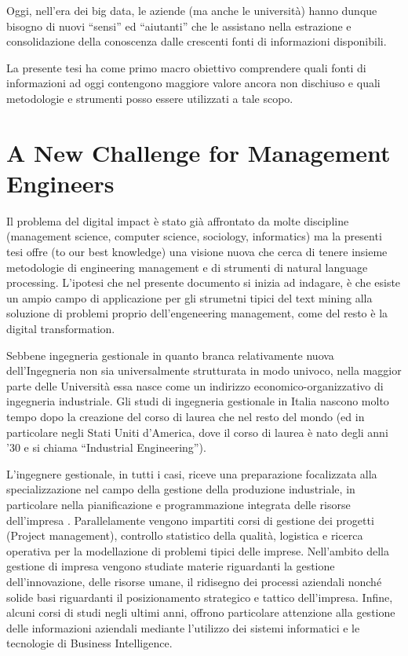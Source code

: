 \documentclass[]{book}
\begin{document}
Oggi, nell'era dei big data, le aziende (ma anche le università) hanno
dunque bisogno di nuovi ``sensi'' ed ``aiutanti'' che le assistano nella
estrazione e consolidazione della conoscenza dalle crescenti fonti di
informazioni disponibili.

La presente tesi ha come primo macro obiettivo comprendere quali fonti
di informazioni ad oggi contengono maggiore valore ancora non dischiuso
e quali metodologie e strumenti posso essere utilizzati a tale scopo.

\section{A New Challenge for Management
Engineers}\label{a-new-challenge-for-management-engineers}

Il problema del digital impact è stato già affrontato da molte
discipline (management science, computer science, sociology,
informatics) ma la presenti tesi offre (to our best knowledge) una
visione nuova che cerca di tenere insieme metodologie di engineering
management e di strumenti di natural language processing. L'ipotesi che
nel presente documento si inizia ad indagare, è che esiste un ampio
campo di applicazione per gli strumetni tipici del text mining alla
soluzione di problemi proprio dell'engeneering management, come del
resto è la digital transformation.

Sebbene ingegneria gestionale in quanto branca relativamente nuova
dell'Ingegneria non sia universalmente strutturata in modo univoco,
nella maggior parte delle Università essa nasce come un indirizzo
economico-organizzativo di ingegneria industriale. Gli studi di
ingegneria gestionale in Italia nascono molto tempo dopo la creazione
del corso di laurea che nel resto del mondo (ed in particolare negli
Stati Uniti d'America, dove il corso di laurea è nato degli anni '30 e
si chiama ``Industrial Engineering'').

L'ingegnere gestionale, in tutti i casi, riceve una preparazione
focalizzata alla specializzazione nel campo della gestione della
produzione industriale, in particolare nella pianificazione e
programmazione integrata delle risorse dell'impresa . Parallelamente
vengono impartiti corsi di gestione dei progetti (Project management),
controllo statistico della qualità, logistica e ricerca operativa per la
modellazione di problemi tipici delle imprese. Nell'ambito della
gestione di impresa vengono studiate materie riguardanti la gestione
dell'innovazione, delle risorse umane, il ridisegno dei processi
aziendali nonché solide basi riguardanti il posizionamento strategico e
tattico dell'impresa. Infine, alcuni corsi di studi negli ultimi anni,
offrono particolare attenzione alla gestione delle informazioni
aziendali mediante l'utilizzo dei sistemi informatici e le tecnologie di
Business Intelligence.
\end{document}
